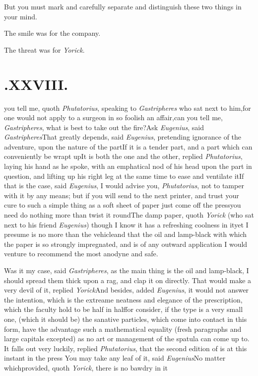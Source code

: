 \documentclass{article}
\begin{document}
But you must mark and carefully separate and distinguish these
two things in your mind.

\tsk The smile was for the company.

\tsk The threat was for \textit{Yorick}.

\bigskip
\section{.\enspace XXVIII.}

 you tell me, quoth
\textit{Phuta\-torius}, speaking to \textit{Gastripheres} who sat next to him,\tsk for
one would not apply to a surgeon in so foolish an affair,\tsk can you tell me,
\textit{Gastripheres}, what is best to take out the fire?\tsk Ask \textit{Eugenius},
said \textit{Gastripheres}\tsk That greatly depends, said \textit{Eugenius},
pretending ignorance of the adventure, upon the nature of the part\tsk If it is a
tender part, and a part which can conveniently be wrapt up\tsk It is both the one
and the other, replied \textit{Phutatorius}, laying his hand as he spoke, with an
emphatical nod of his head upon the part in question, and lifting up his right leg
at the same time to ease and ventilate it\tsh If that is the case, said
\textit{Eugenius}, I would advise you, \textit{Phutatorius}, not to tamper with it
by any means; but if you will send to the next printer, and trust your cure to such
a simple thing as a soft sheet of paper just come off the press\tsk you need do
nothing more than twist it round\tsk The damp paper, quoth \textit{Yorick} (who sat
next to his friend \textit{Eugenius}) though I know it has a refreshing coolness in
it\tsk yet I presume is no more than the vehicle\tsk and that the oil and lamp-black
with which the paper is so strongly impregnated,\break
{}
and is of any outward application I would venture to recommend
the most anodyne and safe.

Was it my case, said \textit{Gastripheres}, as the main thing is the oil and
lamp-black, I should spread them thick upon a rag, and clap it on directly. That
would make a very devil of it, replied \textit{Yorick}\tsh And besides, added
\textit{Eugenius}, it would not answer the intention, which is the extreame neatness
and elegance of the prescription, which the faculty hold to be half in half\tsk for
consider, if the type is a very small one, (which it should be) the sanative
particles, which come into contact in this form, have the advantage 
such a mathematical equality (fresh pa\-ragraphs and
large capitals excepted) as no art or management of the spatula can come up to.
It falls out very luckily, replied \textit{Phutatorius}, that the second edition of
 is at this instant in the press\tsk
You may take any leaf of it, said \textit{Eugenius}\tsk No matter which\tsk provided,
quoth \textit{Yorick}, there is no bawdry in it\tsh
\end{document}
